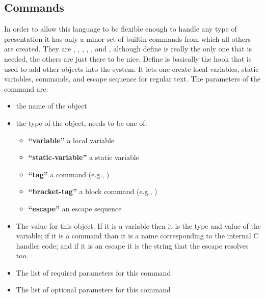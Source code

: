 \subsection{Commands}

In order to allow this language to be flexible enough to handle any type of
presentation it has only a minor set of builtin commands from which all others
are created.  They are , ,
, , , and
, although define is really the only one that is needed,
the others are just there to be nice.  Define is basically the hook that is used
to add other objects into the system.  It lets one create local variables,
static variables, commands, and escape sequence for regular text.  The
parameters of the  command are:

\begin{itemize}
  \item {}
  the name of the object

  \item {}
  the type of the object, needs to be one of:
  \begin{itemize}
    \item \textbf{``variable''}
    a local variable

    \item \textbf{``static-variable''}
    a static variable

    \item \textbf{``tag''}
    a command (e.g., )

    \item \textbf{``bracket-tag''}
    a block command (e.g., )

    \item \textbf{``escape''}
    an escape sequence
  \end{itemize}

  \item {}
  The value for this object.  If it is a variable then it is the type and value of
  the variable; if it is a command than it is a name corresponding to the internal
  C handler code; and if it is an escape it is the string that the escape resolves too.

  \item {}
  The list of required parameters for this command

  \item {}
  The list of optional parameters for this command
\end{itemize}

